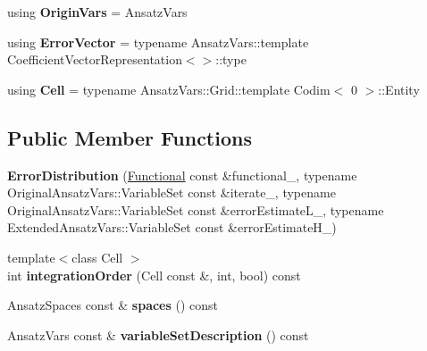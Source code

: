 \begin{DoxyCompactItemize}
\item 
\hypertarget{classSpacy_1_1Kaskade_1_1ErrorDistribution_a240b5610b044689fca859e77e61e826b}{}using {\bfseries Origin\+Vars} = Ansatz\+Vars\label{classSpacy_1_1Kaskade_1_1ErrorDistribution_a240b5610b044689fca859e77e61e826b}

\item 
\hypertarget{classSpacy_1_1Kaskade_1_1ErrorDistribution_ac3d5179ee630171a58f7bacc87c3011e}{}using {\bfseries Error\+Vector} = typename Ansatz\+Vars\+::template Coefficient\+Vector\+Representation$<$$>$\+::type\label{classSpacy_1_1Kaskade_1_1ErrorDistribution_ac3d5179ee630171a58f7bacc87c3011e}

\item 
\hypertarget{classSpacy_1_1Kaskade_1_1ErrorDistribution_a4a981feb92d9e3b609a496195a1bd363}{}using {\bfseries Cell} = typename Ansatz\+Vars\+::\+Grid\+::template Codim$<$ 0 $>$\+::Entity\label{classSpacy_1_1Kaskade_1_1ErrorDistribution_a4a981feb92d9e3b609a496195a1bd363}

\end{DoxyCompactItemize}
\subsection*{Public Member Functions}
\begin{DoxyCompactItemize}
\item 
\hypertarget{classSpacy_1_1Kaskade_1_1ErrorDistribution_add3ba2008f1ea9b470f6ca22c6d6d2fd}{}{\bfseries Error\+Distribution} (\hyperlink{group__SpacyGroup_ga673218f603c93790864aef12c89d3a35_ga673218f603c93790864aef12c89d3a35}{Functional} const \&functional\+\_\+, typename Original\+Ansatz\+Vars\+::\+Variable\+Set const \&iterate\+\_\+, typename Original\+Ansatz\+Vars\+::\+Variable\+Set const \&error\+Estimate\+L\+\_\+, typename Extended\+Ansatz\+Vars\+::\+Variable\+Set const \&error\+Estimate\+H\+\_\+)\label{classSpacy_1_1Kaskade_1_1ErrorDistribution_add3ba2008f1ea9b470f6ca22c6d6d2fd}

\item 
\hypertarget{classSpacy_1_1Kaskade_1_1ErrorDistribution_ab0e1b703d6aa9f12864faf50077b6601}{}{\footnotesize template$<$class Cell $>$ }\\int {\bfseries integration\+Order} (Cell const \&, int, bool) const \label{classSpacy_1_1Kaskade_1_1ErrorDistribution_ab0e1b703d6aa9f12864faf50077b6601}

\item 
\hypertarget{classSpacy_1_1Kaskade_1_1ErrorDistribution_a89d3a13808ef14f73a8aed1fe399863a}{}Ansatz\+Spaces const \& {\bfseries spaces} () const \label{classSpacy_1_1Kaskade_1_1ErrorDistribution_a89d3a13808ef14f73a8aed1fe399863a}

\item 
\hypertarget{classSpacy_1_1Kaskade_1_1ErrorDistribution_a6a10b9121e554a24f06f4b263a7c2b9d}{}Ansatz\+Vars const \& {\bfseries variable\+Set\+Description} () const \label{classSpacy_1_1Kaskade_1_1ErrorDistribution_a6a10b9121e554a24f06f4b263a7c2b9d}

\end{DoxyCompactItemize}
